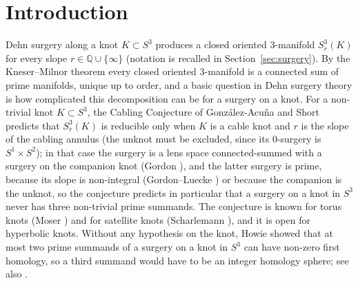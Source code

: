 \documentclass[11pt]{article}
\newcommand{\Q}{\mathbb Q}
\newcommand{\Surg}[2]{S^3_{#1}(#2)}
\theoremstyle{definition}
\theoremstyle{remark}
\begin{document}
\begin{abstract}
An \(L\)-space knot is a knot in \(S^3\) with a non-trivial Dehn surgery
whose Heegaard Floer homology is as small as its first homology allows.
We show that every Dehn surgery on an \(L\)-space knot has at most two
non-trivial prime summands. The proof combines published results on
reducible surgeries (\(L\)-space knots are fibered, by Ni; a reducible
surgery on a hyperbolic knot with a positive \(L\)-space surgery has slope
\(2g-1\), by Hom--Lidman--Zufelt; the Cabling Conjecture holds for
non-trivial non-hyperbolic knots, by Moser and Scharlemann; Gordon's
formula for
surgery on a cable; the Gordon--Luecke theorem on non-integral surgeries)
with an elementary group-theoretic obstruction: if a \(p/q\)-surgery on a
fibered knot of genus \(g\) has a non-trivial integer homology sphere
summand, then \(|p|\le g\). The obstruction is proved by estimating the
minimal number of generators of the commutator subgroup of the
fundamental group in two ways, through the universal abelian cover and
Grushko's theorem on free products on one side and through the
fundamental group of the fiber surface on the other.
\end{abstract}

\section{Introduction}\label{sec:intro}

Dehn surgery along a knot \(K\subset S^3\) produces a closed oriented
\(3\)-manifold \(\Surg{r}{K}\) for every slope
\(r\in\Q\cup\{\infty\}\) (notation is recalled in
Section~\ref{sec:surgery}). By the Kneser--Milnor theorem
every closed
oriented \(3\)-manifold is a connected sum of prime manifolds, unique up to
order, and a basic question in Dehn surgery theory is how complicated this
decomposition can be for a surgery on a knot. For a non-trivial knot
\(K\subset S^3\), the Cabling Conjecture of Gonz\'alez-Acu\~na and Short
\cite{GAS1986} predicts that \(\Surg{r}{K}\) is reducible only when
\(K\) is a cable knot and \(r\) is the slope of the cabling annulus (the
unknot must be excluded, since its \(0\)-surgery is \(S^1\times S^2\)); in
that case the surgery is a lens space connected-summed
with a surgery on the companion knot (Gordon \cite{Gordon1983}), and the
latter surgery is prime, because its slope is non-integral (Gordon--Luecke
\cite{GordonLuecke1987}) or because the companion is the unknot, so the
conjecture predicts in particular that a
surgery on a knot in \(S^3\) never has three non-trivial prime summands.
The conjecture is known for
torus knots (Moser \cite{Moser1971}) and for satellite knots (Scharlemann
\cite{Scharlemann1990}), and it is open for hyperbolic knots. Without any
hypothesis on the knot, Howie \cite{Howie2002} showed that at most two
prime summands of a surgery on a knot in \(S^3\) can have non-zero first
homology, so a third summand would have to be an integer homology sphere;
see also \cite{Howie2010}.
\end{document}
